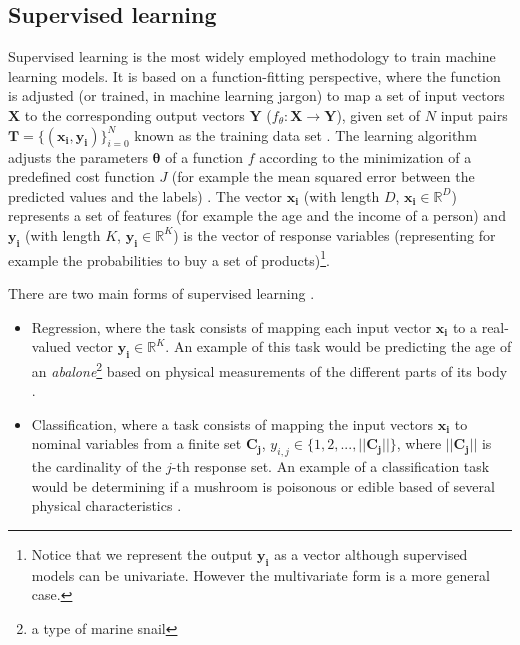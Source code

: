 \subsection{Supervised learning}
Supervised learning is the most widely employed methodology to train machine learning models. It is based on a function-fitting perspective, where the function is adjusted (or trained, in machine learning jargon) to map a set of input vectors $\mathbf{X}$ to the corresponding output vectors $\mathbf{Y}$ ($f_\theta:\mathbf{X}\rightarrow \mathbf{Y}$), given set of $N$ input pairs $\mathbf{T}=\{(\mathbf{x_i},\mathbf{y_i})\}_{i=0}^{N}$ known as the training data set \autocite{theodoridis2015}. The learning algorithm adjusts the parameters $\mathbf{\theta}$ of a function $f$ according to the minimization of a predefined cost function $J$ (for example the mean squared error between the predicted values and the labels) \autocite{hastie2009}. The vector $\mathbf{x_i}$ (with length $D$, $\mathbf{x_i} \in \mathbb{R}^D$) represents a set of features (for example the age and the income of a person)  and $\mathbf{y_i}$ (with length $K$, $\mathbf{y_i}\in\mathbb{R}^K$) is the vector of response variables (representing for example the probabilities to buy a set of products)\footnote{Notice that we represent the output $\mathbf{y_i}$ as a vector although supervised models can be univariate. However the multivariate form is a more general case.}.

There are two main forms of supervised learning  \autocite{murphy2012}.

\begin{itemize}
	\item Regression, where the task consists of mapping each input vector $\mathbf{x_i}$ to a real-valued vector $\mathbf{y_i} \in \mathbb{R}^K$. An example of this task would be predicting the age of an \textit{abalone}\footnote{a type of marine snail} based on physical measurements of the different parts of its body \autocite{dua2019abalone}.
	\item Classification, where a task consists of mapping the input vectors $\mathbf{x_i}$ to nominal variables from a finite set $\mathbf{C_j}$, $y_{i,j} \in \{1,2,...,||\mathbf{C_j}||\}$, where $||\mathbf{C_j}||$ is the cardinality of the $j$-th response set. An example of a classification task would be determining if a mushroom is poisonous or edible based of several physical characteristics \autocite{dua2019abalone}.
\end{itemize}


